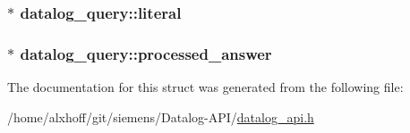 \subsubsection[{\texorpdfstring{literal}{literal}}]{$\ast$ datalog\+\_\+query\+::literal}\hypertarget{structdatalog__query_ae91a9dea687ce035816c38593d171e75}{}\label{structdatalog__query_ae91a9dea687ce035816c38593d171e75}
\subsubsection[{\texorpdfstring{processed\+\_\+answer}{processed_answer}}]{$\ast$ datalog\+\_\+query\+::processed\+\_\+answer}\hypertarget{structdatalog__query_a54e2eef2c18bc5e4c0f0a6c10f1e6397}{}\label{structdatalog__query_a54e2eef2c18bc5e4c0f0a6c10f1e6397}


The documentation for this struct was generated from the following file\+:\begin{DoxyCompactItemize}
\item 
/home/alxhoff/git/siemens/\+Datalog-\/\+A\+P\+I/\hyperlink{datalog__api_8h}{datalog\+\_\+api.\+h}\end{DoxyCompactItemize}
